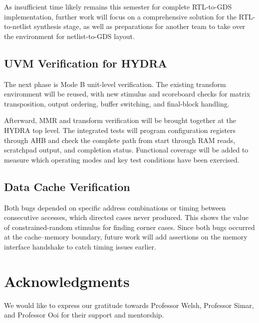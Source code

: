 \documentclass[conference]{IEEEtran}
\begin{document}
        As insufficient time likely remains this semester for complete RTL-to-GDS implementation, further work will focus on a comprehensive solution for the RTL-to-netlist synthesis stage, as well as preparations for another team to take over the environment for netlist-to-GDS layout.
    \subsection{UVM Verification for HYDRA}
        The next phase is Mode B unit-level verification. The existing transform environment will be reused, with new stimulus and scoreboard checks for matrix transposition, output ordering, buffer switching, and final-block handling. 
        
        Afterward, MMR and transform verification will be brought together at the HYDRA top level. The integrated tests will program configuration registers through AHB and check the complete path from start through RAM reads, scratchpad output, and completion status. Functional coverage will be added to measure which operating modes and key test conditions have been exercised.
    \subsection{Data Cache Verification}
       Both bugs depended on specific address combinations or timing between consecutive accesses, which directed cases never produced. This shows the value of constrained-random stimulus for finding corner cases. Since both bugs occurred at the cache--memory boundary, future work will add assertions on the memory interface handshake to catch timing issues earlier.
    
\section{Acknowledgments}
    We would like to express our gratitude towards Professor Welsh, Professor Simar, and Professor Ooi for their support and mentorship.
\end{document}
